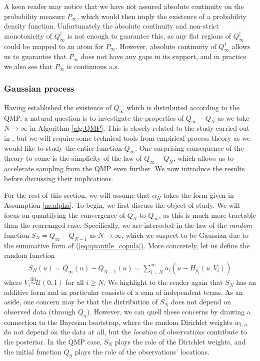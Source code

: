 \documentclass[11pt,a4paper]{article}
\newcommand{\iid}{\overset{\mathrm{iid}}{\sim}}
\begin{document}
A keen reader may notice that we have not assured absolute continuity on the probability measure $P_\infty$, which would then imply the existence of a probability density function. Unfortunately the absolute continuity and non-strict monotonicity of $Q_\infty^{\dagger}$ is not enough to guarantee this, as any flat regions of $Q_\infty^{\dagger}$ could be mapped to an atom for $P_\infty$. However, absolute continuity of $Q_\infty^{\dagger}$ allows us to guarantee that $P_\infty$ does not have any gaps in its support, and in practice we also see that $P_\infty$ is continuous a.s. 



\subsubsection{Gaussian process}
Having established the existence of $Q_\infty$ which is distributed according to the QMP, a natural question is to investigate the properties of $Q_\infty - Q_N$ as we take $N \to \infty$ in {Algorithm \ref{alg:QMP}}. This is closely related to the study carried out in \cite{Fortini2020,Fortini2023,Fortini2024}, but we will require some technical tools from empirical process theory as we would like to study the entire function $Q_\infty$. One surprising consequence of the theory to come is the simplicity of the law of $Q_\infty - Q_N$, which allows us to accelerate  sampling from the QMP even further. We now introduce the results before discussing their implications. 


For the rest of this section, we will assume that
$\alpha_N$ takes the form given in {Assumption \ref{as:alpha}}. To begin, we first discuss the object of study. We will focus on quantifying the convergence of $Q_N$ to $Q_\infty$, as this is much more tractable than the rearranged case. Specifically, we are interested in the law of the \textit{random} function $S_N = Q_\infty - Q_{N-1}$ as $N \to \infty$, which we suspect to be Gaussian due to the summative form of (\ref{eq:quantile_copula}). More concretely, let us define the random function 
\begin{align}\label{eq:SN}
    S_N(u) = Q_\infty(u) - Q_{N-1}(u) = \sum_{i = N}^\infty \alpha_i \left(u - H_{\rho_i}(u,V_i)\right)
\end{align} 
 where $V_i \iid \mathcal{U}(0,1)$ for all $i\geq N$. We highlight to the reader again that $S_N$ has an   additive form and in particular consists of  a sum of independent terms. As an aside, one concern may be that the distribution of $S_N$ does not depend on observed data (through $Q_n$). However, we can quell these concerns by drawing a connection to the Bayesian bootstrap, where the random Dirichlet weights $w_{1:n}$ do not depend on the data at all, but the \textit{location} of observations contribute to the posterior. In the QMP case, $S_N$ plays the role of the Dirichlet weights, and the initial function $Q_n$ plays the role of the observations' locations. 
\end{document}
